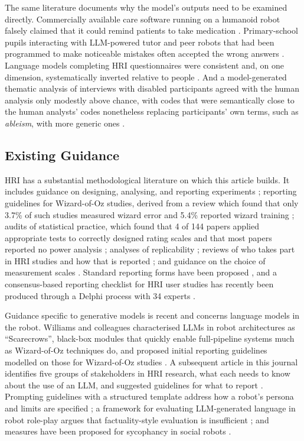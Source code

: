 The same literature documents why the model's outputs need to be examined
directly. Commercially available care software running on a humanoid robot
falsely claimed that it could remind patients to take medication
\cite{ranisch2025rapid}. Primary-school pupils interacting with LLM-powered
tutor and peer robots that had been programmed to make noticeable mistakes
often accepted the wrong answers \cite{rutatola2026robot}. Language models
completing HRI questionnaires were consistent and, on one dimension,
systematically inverted relative to people \cite{lockwood2026when}. And a
model-generated thematic analysis of interviews with disabled participants
agreed with the human analysis only modestly above chance, with codes that
were semantically close to the human analysts' codes nonetheless replacing
participants' own terms, such as \emph{ableism}, with more generic ones
\cite{markelius2026evaluating}.

\subsection{Existing Guidance}

HRI has a substantial methodological literature on which this article
builds. It includes guidance on designing, analysing, and reporting
experiments \cite{bethel2010review,baxter2016characterising,hoffman2020primer};
reporting guidelines for Wizard-of-Oz studies, derived from a review which
found that only 3.7\% of such studies measured wizard error and 5.4\%
reported wizard training \cite{riek2012wizard}; audits of statistical
practice, which found that 4 of 144 papers applied appropriate tests to
correctly designed rating scales \cite{schrum2023concerning} and that most
papers reported no power analysis \cite{bartlett2022have}; analyses of
replicability \cite{leichtmann2022crisis,gunes2022reproducibility,
stower2026children}; reviews of who takes part in HRI studies and how that
is reported \cite{seaborn2023not,cordero2022review}; and guidance on the
choice of measurement scales \cite{saad2026choosing}. Standard reporting
forms have been proposed \cite{bagchi2023towards,holthaus2025would}, and a
consensus-based reporting checklist for HRI user studies has recently been
produced through a Delphi process with 34 experts \cite{chandra2026rush}.

Guidance specific to generative models is recent and concerns language
models in the robot. Williams and colleagues characterised LLMs in robot
architectures as ``Scarecrows'', black-box modules that quickly enable
full-pipeline systems much as Wizard-of-Oz techniques do, and proposed
initial reporting guidelines modelled on those for Wizard-of-Oz studies
\cite{williams2024scarecrows}. A subsequent article in this journal
identifies five groups of stakeholders in HRI research, what each needs to
know about the use of an LLM, and suggested guidelines for what to report
\cite{matuszek2026reporting}. Prompting guidelines with a structured
template address how a robot's persona and limits are specified
\cite{ashok2026why}; a framework for evaluating LLM-generated language in
robot role-play argues that factuality-style evaluation is insufficient
\cite{hohn2024using}; and measures have been proposed for sycophancy in
social robots \cite{seaborn2026robotic}.

